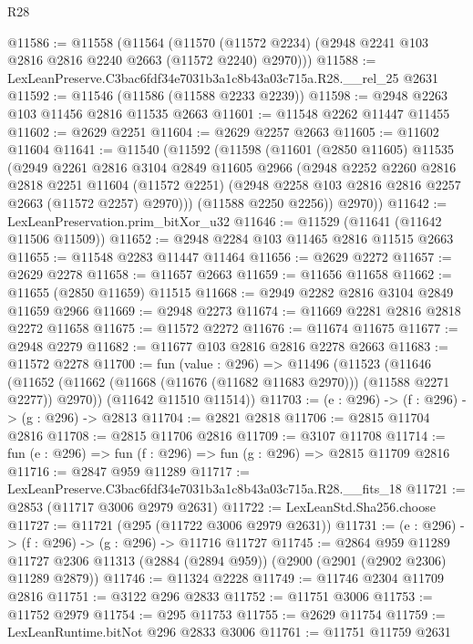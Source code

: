 \begin{lexlean}{R28}
\begin{coremodule}
@11586 := @11558
    (@11564 (@11570 (@11572 @2234) (@2948 @2241 @103 @2816 @2816 @2240 @2663 (@11572 @2240) @2970)))
@11588 := LexLeanPreserve.C3bac6fdf34e7031b3a1c8b43a03c715a.R28.__rel_25 @2631
@11592 := @11546 (@11586 (@11588 @2233 @2239))
@11598 := @2948 @2263 @103 @11456 @2816 @11535 @2663
@11601 := @11548 @2262 @11447 @11455
@11602 := @2629 @2251
@11604 := @2629 @2257 @2663
@11605 := @11602 @11604
@11641 := @11540
    (@11592
      (@11598
        (@11601
          (@2850 @11605)
          @11535
          (@2949
            @2261
            @2816
            @3104
            @2849
            @11605
            @2966
            (@2948
              @2252
              @2260
              @2816
              @2818
              @2251
              @11604
              (@11572 @2251)
              (@2948 @2258 @103 @2816 @2816 @2257 @2663 (@11572 @2257) @2970)))
          (@11588 @2250 @2256))
        @2970))
@11642 := LexLeanPreservation.prim_bitXor_u32
@11646 := @11529 (@11641 (@11642 @11506 @11509))
@11652 := @2948 @2284 @103 @11465 @2816 @11515 @2663
@11655 := @11548 @2283 @11447 @11464
@11656 := @2629 @2272
@11657 := @2629 @2278
@11658 := @11657 @2663
@11659 := @11656 @11658
@11662 := @11655 (@2850 @11659) @11515
@11668 := @2949 @2282 @2816 @3104 @2849 @11659 @2966
@11669 := @2948 @2273
@11674 := @11669 @2281 @2816 @2818 @2272 @11658
@11675 := @11572 @2272
@11676 := @11674 @11675
@11677 := @2948 @2279
@11682 := @11677 @103 @2816 @2816 @2278 @2663
@11683 := @11572 @2278
@11700 := fun (value : @296) =>
  @11496
    (@11523
      (@11646 (@11652 (@11662 (@11668 (@11676 (@11682 @11683 @2970))) (@11588 @2271 @2277)) @2970))
      (@11642 @11510 @11514))
@11703 := (e : @296) -> (f : @296) -> (g : @296) -> @2813
@11704 := @2821 @2818
@11706 := @2815 @11704 @2816
@11708 := @2815 @11706 @2816
@11709 := @3107 @11708
@11714 := fun (e : @296) => fun (f : @296) => fun (g : @296) => @2815 @11709 @2816
@11716 := @2847 @959 @11289
@11717 := LexLeanPreserve.C3bac6fdf34e7031b3a1c8b43a03c715a.R28.__fits_18
@11721 := @2853 (@11717 @3006 @2979 @2631)
@11722 := LexLeanStd.Sha256.choose
@11727 := @11721 (@295 (@11722 @3006 @2979 @2631))
@11731 := (e : @296) -> (f : @296) -> (g : @296) -> @11716 @11727
@11745 := @2864
    @959
    @11289
    @11727
    @2306
    @11313
    (@2884 (@2894 @959))
    (@2900 (@2901 (@2902 @2306) @11289 @2879))
@11746 := @11324 @2228
@11749 := @11746 @2304 @11709 @2816
@11751 := @3122 @296 @2833
@11752 := @11751 @3006
@11753 := @11752 @2979
@11754 := @295 @11753
@11755 := @2629 @11754
@11759 := LexLeanRuntime.bitNot @296 @2833 @3006
@11761 := @11751 @11759 @2631

\end{coremodule}
\end{lexlean}
